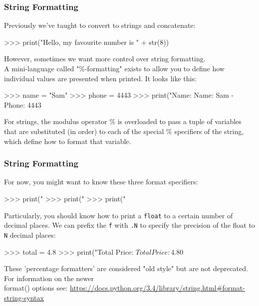 \documentclass{beamer}
\begin{document}
\begin{frame}[fragile]
\frametitle{String Formatting}
Previously we've taught to convert to strings and concatenate:
\begin{code}
>>> print("Hello, my favourite number is " + str(8))
\end{code}

\vskip 0.3cm
However, sometimes we want more control over string formatting.\\
A mini-language called "\%-formatting" exists to allow you to define how individual
values are presented when printed.
It looks like this:

\begin{code}
>>> name = "Sam"
>>> phone = 4443
>>> print("Name: %
Name: Sam - Phone: 4443
\end{code}

For strings, the modulus operator \%
is overloaded to pass a tuple of variables that are substituted (in order)
to each of the
special \% specifiers of the string, which define how to format that variable.
\end{frame}


\begin{frame}[fragile]
\frametitle{String Formatting}
For now, you might want to know these three format specifiers:
\begin{code}
>>> print("%
>>> print("%
>>> print("%
\end{code}

\vskip 0.3cm
Particularly, you should know how to print a \texttt{float} to a certain
    number of decimal places. We can prefix the \texttt{f} with \texttt{.N}
    to specify the precision of the float to \texttt{N} decimal places:
\begin{code}
>>> total = 4.8
>>> print("Total Price: $%
Total Price: $4.80
\end{code}

{\tiny{These 'percentage formatters' are considered "old style" but are not deprecated. For information on the newer\\\vskip -0.15cm format() options see: \url{https://docs.python.org/3.4/library/string.html#format-string-syntax}}}
\end{frame}
\end{document}
